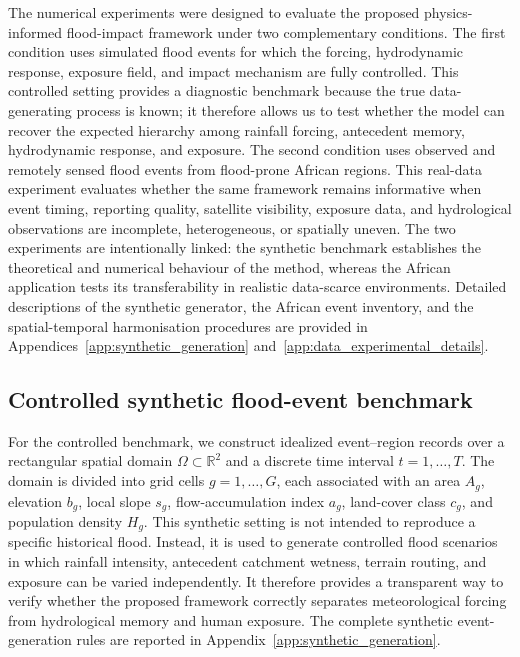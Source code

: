 \documentclass[pdflatex,sn-mathphys-ay]{sn-jnl}
\theoremstyle{thmstyleone}
\begin{document}
The numerical experiments were designed to evaluate the proposed
physics-informed flood-impact framework under two complementary
conditions.  The first condition uses simulated flood events for which
the forcing, hydrodynamic response, exposure field, and impact
mechanism are fully controlled.  This controlled setting provides a
diagnostic benchmark because the true data-generating process is known;
it therefore allows us to test whether the model can recover the
expected hierarchy among rainfall forcing, antecedent memory,
hydrodynamic response, and exposure.  The second condition uses
observed and remotely sensed flood events from flood-prone African
regions.  This real-data experiment evaluates whether the same
framework remains informative when event timing, reporting quality,
satellite visibility, exposure data, and hydrological observations are
incomplete, heterogeneous, or spatially uneven.  The two experiments
are intentionally linked: the synthetic benchmark establishes the
theoretical and numerical behaviour of the method, whereas the African
application tests its transferability in realistic data-scarce
environments.  Detailed descriptions of the synthetic generator, the
African event inventory, and the spatial-temporal harmonisation
procedures are provided in Appendices~\ref{app:synthetic_generation}
and~\ref{app:data_experimental_details}.

\subsection{Controlled synthetic flood-event benchmark}
\label{subsec:synthetic_benchmark}

For the controlled benchmark, we construct idealized event--region
records over a rectangular spatial domain
$\Omega\subset\mathbb{R}^{2}$ and a discrete time interval
$t=1,\ldots,T$.  The domain is divided into grid cells
$g=1,\ldots,G$, each associated with an area $A_g$, elevation
$b_g$, local slope $s_g$, flow-accumulation index $a_g$, land-cover
class $c_g$, and population density $H_g$.  This synthetic setting is
not intended to reproduce a specific historical flood.  Instead, it is
used to generate controlled flood scenarios in which rainfall intensity,
antecedent catchment wetness, terrain routing, and exposure can be
varied independently.  It therefore provides a transparent way to
verify whether the proposed framework correctly separates
meteorological forcing from hydrological memory and human exposure.
The complete synthetic event-generation rules are reported in
Appendix~\ref{app:synthetic_generation}.
\end{document}
